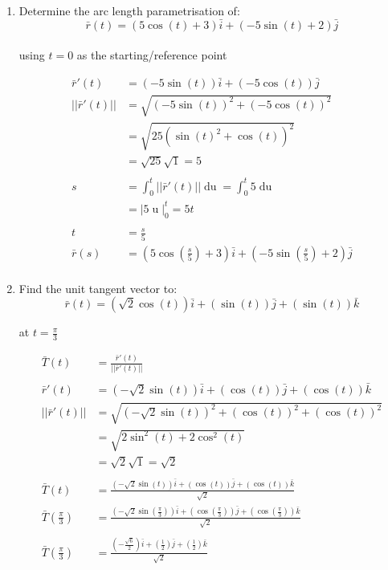 \documentclass[a4paper,11pt]{article}
\begin{document}
\begin{enumerate}
\begin{enumerate}
        \newpage
        \item  Determine the arc length parametrisation of:\\
        $$ \bar{r}(t) = (5\cos(t) + 3)\bar{i} + (-5\sin(t) + 2)\bar{j} $$\\
        using $t = 0$ as the starting/reference point

        \begin{align*}
            \bar{r}'(t) &= (-5\sin(t))\bar{i} + (-5\cos(t))\bar{j}\\
            || \bar{r}'(t) || &= \sqrt{(-5\sin(t))^2 + (-5\cos(t))^2}\\
            &= \sqrt{25(\sin(t)^2 + \cos(t))^2}\\
            &= \sqrt{25}\sqrt{1} = 5\\\\
            s &= \int^t_0 || \bar{r}'(t) ||\operatorname{du} = \int^t_0 5 \operatorname{du}\\
            &= \Big| 5\operatorname{u} \Big|^t_0 = 5t\\\\
            t &= \frac{s}{5}\\
            \bar{r}(s) &= \left(5\cos\left(\frac{s}{5}\right) + 3\right)\bar{i} + \left(-5\sin\left(\frac{s}{5}\right) + 2\right) \bar{j}\\
        \end{align*}

        \item Find the unit tangent vector to:\\
        $$ \bar{r}(t) = (\sqrt{2}\cos(t))\bar{i} + (\sin(t))\bar{j} + (\sin(t))\bar{k} $$

        at $t = \frac{\pi}{3}$

        \begin{align*}
            \bar{T}(t) &= \frac{\bar{r}'(t)}{|| \bar{r}'(t) ||}\\\\
            \bar{r}'(t) &= (- \sqrt{2}\sin(t))\bar{i} + (\cos(t))\bar{j} + (\cos(t))\bar{k}\\
            || \bar{r}'(t) || &= \sqrt{(- \sqrt{2}\sin(t))^2 + (\cos(t))^2+ (\cos(t))^2}\\
            &= \sqrt{2 \sin^2(t) + 2 \cos^2(t)}\\
            &= \sqrt{2}\sqrt{1} = \sqrt{2}\\\\
            \bar{T}(t) &= \frac{(- \sqrt{2}\sin(t))\bar{i} + (\cos(t))\bar{j} + (\cos(t))\bar{k}}{\sqrt{2}}\\
            \bar{T}\left(\frac{\pi}{3}\right) &= \frac{(- \sqrt{2}\sin(\frac{\pi}{3}))\bar{i} + (\cos(\frac{\pi}{3}))\bar{j} + (\cos(\frac{\pi}{3}))\bar{k}}{\sqrt{2}}\\\\
            \bar{T}\left(\frac{\pi}{3}\right) &= \frac{\left( -\frac{\sqrt{6}}{2} \right) \bar{i} + \left(\frac{1}{2}\right) \bar{j} + \left(\frac{1}{2}\right)\bar{k} }{\sqrt{2}}
        \end{align*}


\end{enumerate}
\end{enumerate}
\end{document}
